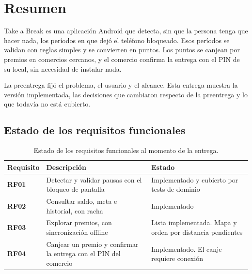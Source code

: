 \section{Resumen}

Take a Break es una aplicación Android que detecta, sin que la persona tenga que hacer nada, los
períodos en que dejó el teléfono bloqueado. Esos períodos se validan con reglas simples y se convierten
en puntos. Los puntos se canjean por premios en comercios cercanos, y el comercio confirma la entrega
con el PIN de su local, sin necesidad de instalar nada.

La preentrega fijó el problema, el usuario y el alcance. Esta entrega muestra la versión implementada,
las decisiones que cambiaron respecto de la preentrega y lo que todavía no está cubierto.

\subsection{Estado de los requisitos funcionales}

\begin{table}[H]
\centering
\begin{tabularx}{\linewidth}{@{}>{\bfseries}l L L@{}}
\toprule
Requisito & Descripción & Estado \\
\midrule
RF01 & Detectar y validar pausas con el bloqueo de pantalla & Implementado y cubierto por tests de dominio \\
RF02 & Consultar saldo, meta e historial, con racha & Implementado \\
RF03 & Explorar premios, con sincronización offline & Lista implementada. Mapa y orden por distancia pendientes \\
RF04 & Canjear un premio y confirmar la entrega con el PIN del comercio & Implementado. El canje requiere conexión \\
\bottomrule
\end{tabularx}
\caption{Estado de los requisitos funcionales al momento de la entrega.}
\end{table}
